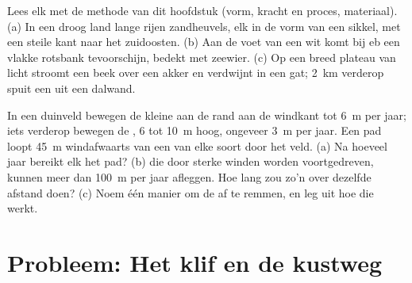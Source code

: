 \begin{exercise}[$\star\star\star$]\label{exo:g9:landforms:11}
Lees elk  met de methode van dit hoofdstuk (vorm, kracht en
proces, materiaal). (a) In een droog land lange rijen zandheuvels, elk in
de vorm van een sikkel, met een steile kant naar het zuidoosten. (b) Aan de
voet van een wit  komt bij eb een vlakke rotsbank tevoorschijn, bedekt
met zeewier. (c) Op een breed plateau van licht  stroomt een beek
over een akker en verdwijnt in een gat; \qty{2}{km} verderop spuit een 
uit een dalwand.
\end{exercise}

\begin{exercise}[$\star\star\star$]\label{exo:g9:landforms:12}
In een duinveld bewegen de kleine  aan de rand aan de windkant tot
\qty{6}{m} per jaar; iets verderop bewegen de , 6 tot \qty{10}{m}
hoog, ongeveer \qty{3}{m} per jaar. Een pad loopt \qty{45}{m} windafwaarts
van een  van elke soort door het veld. (a) Na hoeveel jaar bereikt elk
 het pad? (b)  die door sterke winden worden voortgedreven,
kunnen meer dan \qty{100}{m} per jaar afleggen. Hoe lang zou zo'n  over
dezelfde afstand doen? (c) Noem één manier om de  af te remmen, en
leg uit hoe die werkt.
\end{exercise}

\section{Probleem: Het klif en de kustweg}

